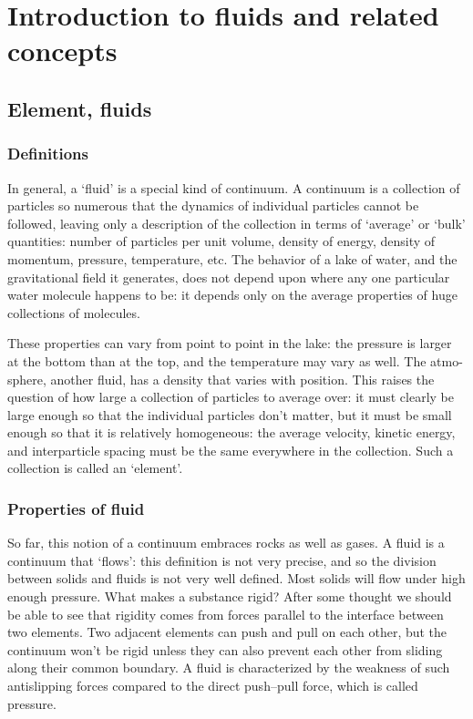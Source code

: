 \documentclass{article}
\title{}
\begin{document}
\maketitle

\section{Introduction to fluids and related concepts}
\subsection{Element, fluids}
\subsubsection{Definitions}
In general, a ‘fluid’ is a special kind of continuum. A continuum is a collection of particles so numerous that the dynamics of individual particles cannot be followed, leaving only a description of the collection in terms of ‘average’ or ‘bulk’ quantities: number of particles per unit volume, density of energy, density of momentum, pressure, temperature, etc. The behavior of a lake of water, and the gravitational field it generates, does not depend upon where any one particular water molecule happens to be: it depends only on the average properties of huge collections of molecules.

These properties can vary from point to point in the lake: the pressure is larger at the bottom than at the top, and the temperature may vary as well. The atmo-sphere, another fluid, has a density that varies with position. This raises the question of how large a collection of particles to average over: it must clearly be large enough so that the individual particles don’t matter, but it must be small enough so that it is relatively homogeneous: the average velocity, kinetic energy, and interparticle spacing must be the same everywhere in the collection. Such a collection is called an ‘element’.

\subsubsection{Properties of fluid}

So far, this notion of a continuum embraces rocks as well as gases. A fluid is a continuum that ‘flows’: this definition is not very precise, and so the division between solids and fluids is not very well defined. Most solids will flow under high enough pressure. What makes a substance rigid? After some thought we should be able to see that rigidity comes from forces parallel to the interface between two elements. Two adjacent elements can push and pull on each other, but the continuum won’t be rigid unless they can also prevent each other from sliding along their common boundary. A fluid is characterized by the weakness of such antislipping forces compared to the direct push–pull force, which is called pressure.
\end{document}

